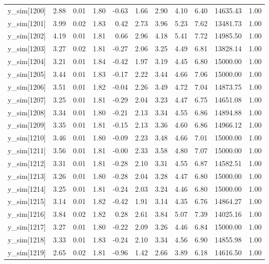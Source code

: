 \begin{table}[ht]
\begin{tabular}{rrrrrrrrrrr}
  y\_sim[1200] & 2.88 & 0.01 & 1.80 & -0.63 & 1.66 & 2.90 & 4.10 & 6.40 & 14635.43 & 1.00 \\ 
  y\_sim[1201] & 3.99 & 0.02 & 1.83 & 0.42 & 2.73 & 3.96 & 5.23 & 7.62 & 13481.73 & 1.00 \\ 
  y\_sim[1202] & 4.19 & 0.01 & 1.81 & 0.66 & 2.96 & 4.18 & 5.41 & 7.72 & 14985.50 & 1.00 \\ 
  y\_sim[1203] & 3.27 & 0.02 & 1.81 & -0.27 & 2.06 & 3.25 & 4.49 & 6.81 & 13828.14 & 1.00 \\ 
  y\_sim[1204] & 3.21 & 0.01 & 1.84 & -0.42 & 1.97 & 3.19 & 4.45 & 6.80 & 15000.00 & 1.00 \\ 
  y\_sim[1205] & 3.44 & 0.01 & 1.83 & -0.17 & 2.22 & 3.44 & 4.66 & 7.06 & 15000.00 & 1.00 \\ 
  y\_sim[1206] & 3.51 & 0.01 & 1.82 & -0.04 & 2.26 & 3.49 & 4.72 & 7.04 & 14873.75 & 1.00 \\ 
  y\_sim[1207] & 3.25 & 0.01 & 1.81 & -0.29 & 2.04 & 3.23 & 4.47 & 6.75 & 14651.08 & 1.00 \\ 
  y\_sim[1208] & 3.34 & 0.01 & 1.80 & -0.21 & 2.13 & 3.34 & 4.55 & 6.86 & 14894.88 & 1.00 \\ 
  y\_sim[1209] & 3.35 & 0.01 & 1.81 & -0.15 & 2.13 & 3.36 & 4.60 & 6.86 & 14966.12 & 1.00 \\ 
  y\_sim[1210] & 3.46 & 0.01 & 1.80 & -0.09 & 2.23 & 3.48 & 4.66 & 7.01 & 15000.00 & 1.00 \\ 
  y\_sim[1211] & 3.56 & 0.01 & 1.81 & -0.00 & 2.33 & 3.58 & 4.80 & 7.07 & 15000.00 & 1.00 \\ 
  y\_sim[1212] & 3.31 & 0.01 & 1.81 & -0.28 & 2.10 & 3.31 & 4.55 & 6.87 & 14582.51 & 1.00 \\ 
  y\_sim[1213] & 3.26 & 0.01 & 1.80 & -0.28 & 2.04 & 3.28 & 4.47 & 6.80 & 15000.00 & 1.00 \\ 
  y\_sim[1214] & 3.25 & 0.01 & 1.81 & -0.24 & 2.03 & 3.24 & 4.46 & 6.80 & 15000.00 & 1.00 \\ 
  y\_sim[1215] & 3.14 & 0.01 & 1.82 & -0.42 & 1.91 & 3.14 & 4.35 & 6.76 & 14864.27 & 1.00 \\ 
  y\_sim[1216] & 3.84 & 0.02 & 1.82 & 0.28 & 2.61 & 3.84 & 5.07 & 7.39 & 14025.16 & 1.00 \\ 
  y\_sim[1217] & 3.27 & 0.01 & 1.80 & -0.22 & 2.09 & 3.26 & 4.46 & 6.84 & 15000.00 & 1.00 \\ 
  y\_sim[1218] & 3.33 & 0.01 & 1.83 & -0.24 & 2.10 & 3.34 & 4.56 & 6.90 & 14855.98 & 1.00 \\ 
  y\_sim[1219] & 2.65 & 0.02 & 1.81 & -0.96 & 1.42 & 2.66 & 3.89 & 6.18 & 14616.50 & 1.00 \\ 

\end{tabular}
\end{table}
